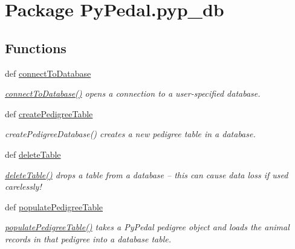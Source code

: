 \hypertarget{namespacePyPedal_1_1pyp__db}{
\section{Package Py\-Pedal.pyp\_\-db}
\label{namespacePyPedal_1_1pyp__db}
}


\subsection*{Functions}
\begin{CompactItemize}
\item 
def \hyperlink{namespacePyPedal_1_1pyp__db_cad3d0a6a0c643e81c8135aff1d1ad37}{connect\-To\-Database}
\begin{CompactList}\small\item\em \hyperlink{namespacePyPedal_1_1pyp__db_cad3d0a6a0c643e81c8135aff1d1ad37}{connect\-To\-Database()} opens a connection to a user-specified database. \item\end{CompactList}\item 
def \hyperlink{namespacePyPedal_1_1pyp__db_7c8d70a4ec6c7f537291d79fb4118573}{create\-Pedigree\-Table}
\begin{CompactList}\small\item\em create\-Pedigree\-Database() creates a new pedigree table in a database. \item\end{CompactList}\item 
def \hyperlink{namespacePyPedal_1_1pyp__db_5c8b6cc2ea0230b94b0f42f3dfb8556b}{delete\-Table}
\begin{CompactList}\small\item\em \hyperlink{namespacePyPedal_1_1pyp__db_5c8b6cc2ea0230b94b0f42f3dfb8556b}{delete\-Table()} drops a table from a database -- this can cause data loss if used carelessly! \item\end{CompactList}\item 
def \hyperlink{namespacePyPedal_1_1pyp__db_bdfacecb7932eb4036f2dcfb4c39a534}{populate\-Pedigree\-Table}
\begin{CompactList}\small\item\em \hyperlink{namespacePyPedal_1_1pyp__db_bdfacecb7932eb4036f2dcfb4c39a534}{populate\-Pedigree\-Table()} takes a Py\-Pedal pedigree object and loads the animal records in that pedigree into a database table. \item\end{CompactList}\item 

\end{CompactItemize}
